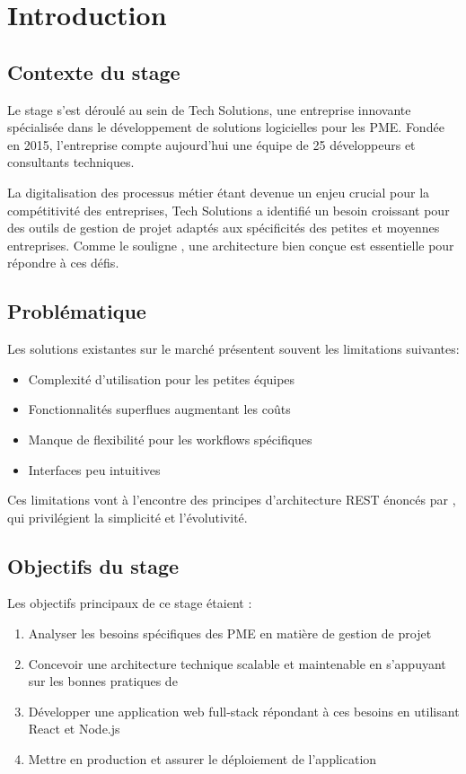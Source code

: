 \chapter{Introduction}

\section{Contexte du stage}
Le stage s'est déroulé au sein de Tech Solutions, une entreprise innovante spécialisée dans le développement de solutions logicielles pour les PME. Fondée en 2015, l'entreprise compte aujourd'hui une équipe de 25 développeurs et consultants techniques.

La digitalisation des processus métier étant devenue un enjeu crucial pour la compétitivité des entreprises, Tech Solutions a identifié un besoin croissant pour des outils de gestion de projet adaptés aux spécificités des petites et moyennes entreprises. Comme le souligne \cite{martin2017clean}, une architecture bien conçue est essentielle pour répondre à ces défis.

\section{Problématique}
Les solutions existantes sur le marché présentent souvent les limitations suivantes:
\begin{itemize}
	\item Complexité d'utilisation pour les petites équipes
	\item Fonctionnalités superflues augmentant les coûts
	\item Manque de flexibilité pour les workflows spécifiques
	\item Interfaces peu intuitives
\end{itemize}

Ces limitations vont à l'encontre des principes d'architecture REST énoncés par \cite{fielding2000rest}, qui privilégient la simplicité et l'évolutivité.

\section{Objectifs du stage}
Les objectifs principaux de ce stage étaient :
\begin{enumerate}
	\item Analyser les besoins spécifiques des PME en matière de gestion de projet
	\item Concevoir une architecture technique scalable et maintenable en s'appuyant sur les bonnes pratiques de \cite{martin2017clean}
	\item Développer une application web full-stack répondant à ces besoins en utilisant React \cite{react2024} et Node.js \cite{nodejs2024}
	\item Mettre en production et assurer le déploiement de l'application
\end{enumerate}

